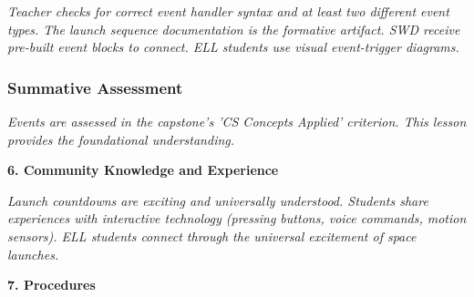\documentclass[11pt,letterpaper]{article}
\begin{document}
\textit{Teacher checks for correct event handler syntax and at least two different event types. The launch sequence documentation is the formative artifact. SWD receive pre-built event blocks to connect. ELL students use visual event-trigger diagrams.}

\subsubsection{Summative Assessment}

\textit{Events are assessed in the capstone's 'CS Concepts Applied' criterion. This lesson provides the foundational understanding.}

\textbf{6. Community Knowledge and Experience}

\textit{Launch countdowns are exciting and universally understood. Students share experiences with interactive technology (pressing buttons, voice commands, motion sensors). ELL students connect through the universal excitement of space launches.}

\textbf{7. Procedures}
\end{document}
